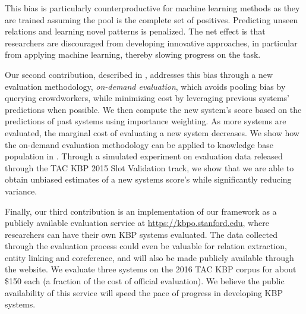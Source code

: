 This bias is particularly counterproductive for machine learning methods as they are trained assuming the pool is the complete set of positives.
Predicting unseen relations and learning novel patterns is penalized.
The net effect is that researchers are discouraged from developing innovative approaches, in particular from applying machine learning, thereby slowing progress on the task. 


Our second contribution, described in , addresses this bias through a new evaluation methodology, \emph{on-demand evaluation},
which avoids pooling bias by querying crowdworkers,
while minimizing cost by leveraging previous systems' predictions when possible.
We then compute the new system's score based on the predictions of past systems using importance weighting.
As more systems are evaluated, the marginal cost of evaluating a new system decreases.
We show how the on-demand evaluation methodology can be applied to knowledge base population in .
Through a simulated experiment on evaluation data released through the TAC KBP 2015 Slot Validation track, we show that we are able to obtain unbiased estimates of a new systems score's while significantly reducing variance.

Finally, our third contribution is an implementation of our framework as a publicly available evaluation service at \url{https://kbpo.stanford.edu}, where researchers can have their own KBP systems evaluated.
The data collected through the evaluation process could even be valuable for relation extraction, entity linking and coreference, and will also be made publicly available through the website.
We evaluate three systems on the 2016 TAC KBP corpus for about \$150 each (a fraction of the cost of official evaluation).
We believe the public availability of this service will speed the pace of progress in developing KBP systems.

